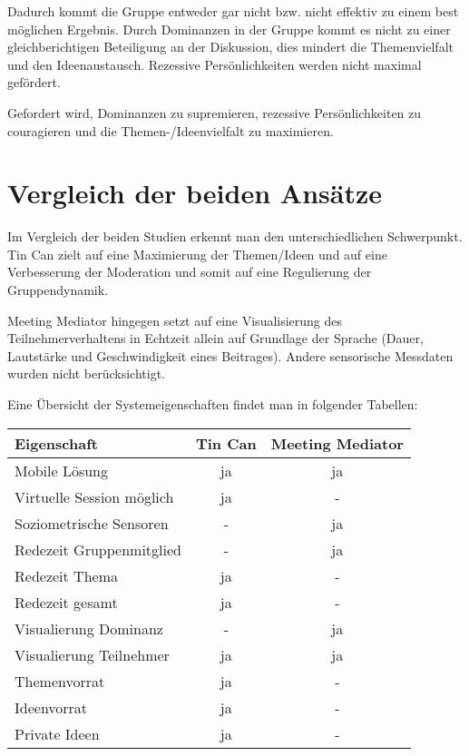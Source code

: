 \documentclass{seminarvorlage}
\begin{document}
Dadurch kommt die Gruppe entweder gar nicht bzw. nicht effektiv zu einem best
möglichen Ergebnis. Durch Dominanzen in der Gruppe kommt es nicht zu einer
gleichberichtigen Beteiligung an der Diskussion, dies mindert die Themenvielfalt
und den Ideenaustausch. Rezessive Persönlichkeiten werden nicht maximal
gefördert.

Gefordert wird, Dominanzen zu supremieren, rezessive Persönlichkeiten zu
couragieren und die Themen-/Ideenvielfalt zu maximieren.




\section{Vergleich der beiden Ansätze}
Im Vergleich der beiden Studien erkennt man den unterschiedlichen Schwerpunkt.
Tin Can zielt auf eine Maximierung der Themen/Ideen und auf eine Verbesserung
der Moderation und somit auf eine Regulierung der Gruppendynamik.

Meeting Mediator hingegen setzt auf eine Visualisierung des Teilnehmerverhaltens
in Echtzeit allein auf Grundlage der Sprache (Dauer, Lautstärke und Geschwindigkeit
eines Beitrages). Andere sensorische Messdaten wurden nicht berücksichtigt.

Eine Übersicht der Systemeigenschaften findet man in folgender Tabellen:

\begin{tabular}{ l | c | c }
  Eigenschaft & Tin Can & Meeting Mediator \\
  \hline
  Mobile Lösung & ja & ja \\
  Virtuelle Session möglich & ja & - \\
  Soziometrische Sensoren & - & ja \\
  \hline
  Redezeit Gruppenmitglied & - & ja \\
  Redezeit Thema  & ja & - \\
  Redezeit gesamt & ja & - \\
  \hline
  
  Visualierung Dominanz & - & ja \\
  Visualierung Teilnehmer & ja & ja \\
  
  Themenvorrat & ja & - \\
  Ideenvorrat & ja & - \\
  Private Ideen & ja & - \\
\end{tabular}
\end{document}
